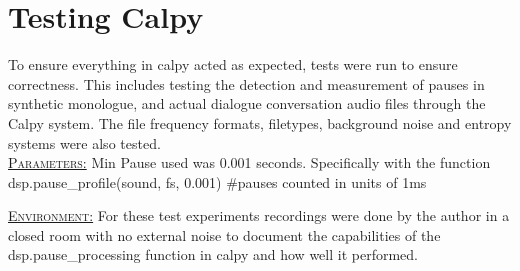 \section{Testing Calpy}
To ensure everything in calpy acted as expected, tests were run to ensure correctness. This includes testing the detection and measurement of pauses in synthetic monologue, and actual dialogue conversation audio files through the Calpy system. The file frequency formats, filetypes, background noise and entropy systems were also tested.\\


\underline{\textsc{Parameters:}} Min Pause used was 0.001 seconds. Specifically with the function dsp.pause\_profile(sound, fs, 0.001) #pauses counted in units of 1ms

\underline{\textsc{Environment:}} For these test experiments recordings were done by the author in a closed room with no external noise to document the capabilities of the dsp.pause\_processing function in calpy and how well it performed. 






%

%





%

%





